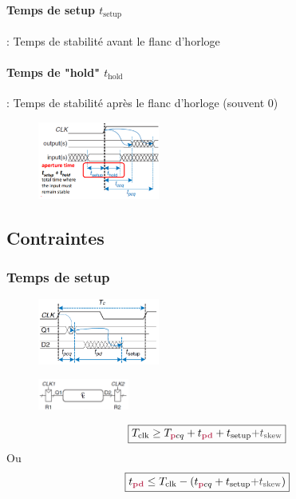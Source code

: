 \documentclass[resume]{subfiles}
\begin{document}
\begin{multicols}{3}
\paragraph{Temps de setup $t_{\text{setup}}$} : Temps de stabilité avant le flanc d'horloge
\paragraph{Temps de "hold" $t_{\text{hold}}$} : Temps de stabilité après le flanc d'horloge (souvent 0)
\begin{figure}[H]
\centering
\includegraphics[width=4.00cm]{img_32.png}
\end{figure}
\subsection{Contraintes}
\subsubsection{Temps de setup}
\begin{figure}[H]
\centering
\includegraphics[width=4cm]{img_33.png}
\end{figure}
\begin{figure}[H]
\centering
\includegraphics[width=3.00cm]{img_34.png}
\end{figure}
$$\boxed{T_{\text{clk}}\geq T_{\pdel cq}+t_{\pdelay}+t_{\text{setup}}\textcolor{darkgray}{+t_{\text{skew}}}}$$
Ou
$$\boxed{t_{\pdelay}\leq T_{\text{clk}}-(t_{\pdel cq} + t_{\text{setup}}\textcolor{darkgray}{+t_{\text{skew}}})}$$

\end{multicols}
\end{document}
